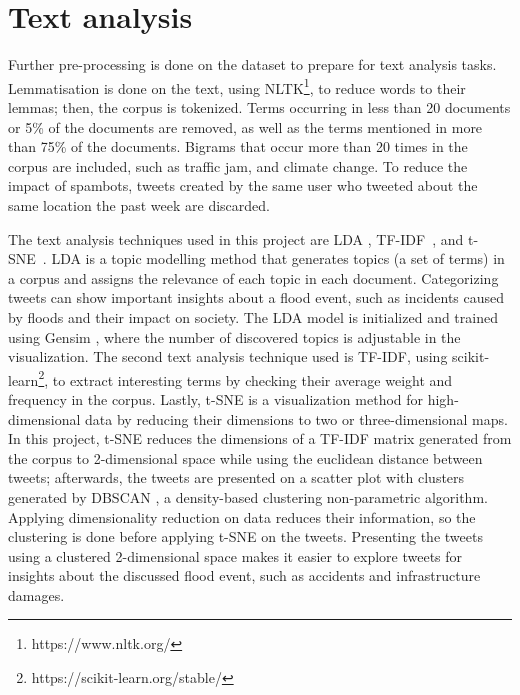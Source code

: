 \section{Text analysis}

Further pre-processing is done on the dataset to prepare for text analysis tasks. Lemmatisation is
done on the text, using \ac{NLTK}\footnote{https://www.nltk.org/}, to reduce words to their lemmas;
then, the corpus is tokenized. Terms occurring in less than 20 documents or 5\% of
the documents are removed, as well as the terms mentioned in more than 75\% of the documents.
Bigrams that occur more than 20 times in the corpus are included, such as traffic jam, and climate
change. To reduce the impact of spambots, tweets created by the same user who tweeted about the same location the past
week are discarded.

The text analysis techniques used in this project are \ac{LDA}
\cite{falushInferencePopulationStructure2003}\cite{pritchardInferencePopulationStructure2000},
\ac{TF-IDF}~\cite{saltonTermweightingApproachesAutomatic1988}, and
\ac{t-SNE}~\cite{vandermaatenVisualizingHighDimensionalData2008}. \ac{LDA} is a topic modelling
method that generates topics (a set of terms) in a corpus and assigns the relevance of each topic in
each document. Categorizing tweets can show important insights about a flood event, such as
incidents caused by floods and their impact on society. The \ac{LDA} model is initialized and
trained using Gensim \cite{rehurek_lrec}, where the number of discovered topics is adjustable in the
visualization. The second text analysis technique used is \ac{TF-IDF}, using
scikit-learn\footnote{https://scikit-learn.org/stable/}, to extract interesting terms by checking
their average weight and frequency in the corpus. Lastly, \ac{t-SNE} is a visualization method for
high-dimensional data by reducing their dimensions to two or three-dimensional maps. In this
project, \ac{t-SNE} reduces the dimensions of a \ac{TF-IDF} matrix generated from the corpus to
2-dimensional space while using the euclidean distance between tweets; afterwards, the tweets are
presented on a scatter plot with clusters generated by \ac{DBSCAN}
\cite{esterDensitybasedAlgorithmDiscovering1996}, a density-based clustering non-parametric
algorithm. Applying dimensionality reduction on data reduces their information, so the clustering is
done before applying \ac{t-SNE} on the tweets. Presenting the tweets using a clustered 2-dimensional
space makes it easier to explore tweets for insights about the discussed flood event, such as
accidents and infrastructure damages.

